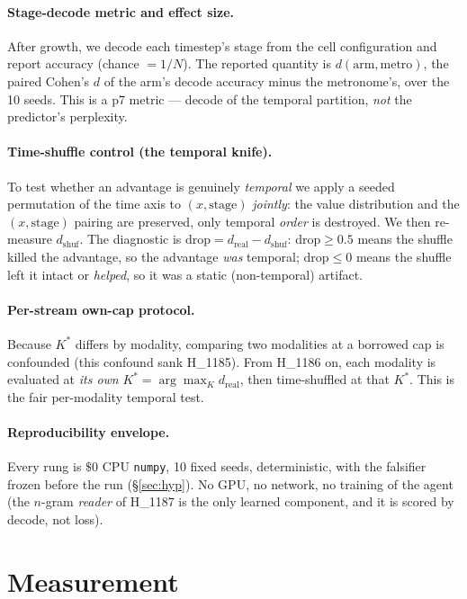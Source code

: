 \documentclass[11pt,a4paper]{article}
\newcommand{\dreal}{d_{\mathrm{real}}}
\newcommand{\dshuf}{d_{\mathrm{shuf}}}
\newcommand{\Kstar}{K^{\!*}}
\begin{document}
\paragraph{Stage-decode metric and effect size.}
After growth, we decode each timestep's stage from the cell configuration and
report accuracy (chance $=1/N$). The reported quantity is
$d(\text{arm},\text{metro})$, the paired Cohen's $d$ \citep{cohen1988statistical}
of the arm's decode accuracy minus the metronome's, over the 10 seeds. This is a
p7 metric --- decode of the temporal partition, \emph{not} the predictor's
perplexity.

\paragraph{Time-shuffle control (the temporal knife).}
To test whether an advantage is genuinely \emph{temporal} we apply a seeded
permutation of the time axis to $(x,\text{stage})$ \emph{jointly}: the value
distribution and the $(x,\text{stage})$ pairing are preserved, only temporal
\emph{order} is destroyed. We then re-measure $\dshuf$. The diagnostic is
$\text{drop}=\dreal-\dshuf$: $\text{drop}\geq 0.5$ means the shuffle killed the
advantage, so the advantage \emph{was} temporal; $\text{drop}\leq 0$ means the
shuffle left it intact or \emph{helped}, so it was a static (non-temporal)
artifact.

\paragraph{Per-stream own-cap protocol.}
Because $\Kstar$ differs by modality, comparing two modalities at a borrowed cap is
confounded (this confound sank H\_1185). From H\_1186 on, each modality is
evaluated at \emph{its own} $\Kstar=\arg\max_K \dreal$, then time-shuffled at that
$\Kstar$. This is the fair per-modality temporal test.

\paragraph{Reproducibility envelope.}
Every rung is $\$0$ CPU \texttt{numpy}, 10 fixed seeds, deterministic, with the
falsifier frozen before the run (\S\ref{sec:hyp}). No GPU, no network, no
training of the agent (the $n$-gram \emph{reader} of H\_1187 is the only learned
component, and it is scored by decode, not loss).

\section{Measurement}
\label{sec:measure}
\end{document}
